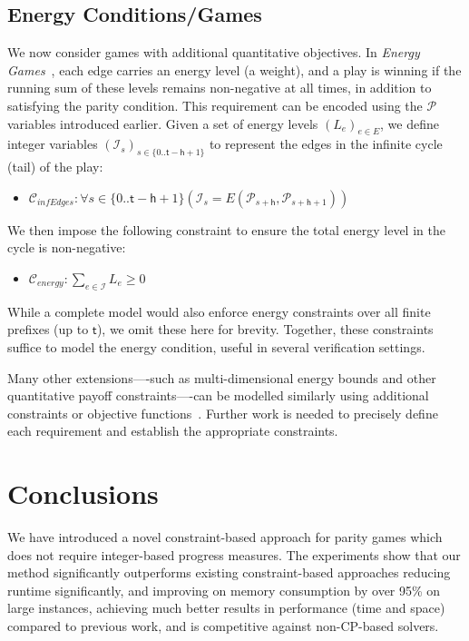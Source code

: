 \documentclass[runningheads]{llncs}
\begin{document}
\subsection{Energy Conditions/Games}

We now consider games with additional quantitative objectives. In \textit{Energy Games}~\cite{Chatterjee:2010}, each edge carries an energy level (a weight), and a play is winning if the running sum of these levels remains non-negative at all times, in addition to satisfying the parity condition.
%
This requirement can be encoded using the $\mathcal{P}$ variables introduced earlier. Given a set of energy levels $(L_e)_{e \in E}$, we define integer variables $(\mathcal{I}_s)_{s \in \{0..\mathsf{t} - \mathsf{h} + 1\}}$ to represent the edges in the infinite cycle (tail) of the play:

\begin{itemize}
    \item $\mathcal{C}_{\textit{infEdges}} : \forall s \in \{0..\mathsf{t} - \mathsf{h} + 1\} (\mathcal{I}_s = E(\mathcal{P}_{s+\mathsf{h}}, \mathcal{P}_{s+\mathsf{h}+1}))$
\end{itemize}

We then impose the following constraint to ensure the total energy level in the cycle is non-negative:

\begin{itemize}
    \item $\mathcal{C}_{\textit{energy}} : \sum_{e \in \mathcal{I}} L_e \geq 0$
\end{itemize}

While a complete model would also enforce energy constraints over all finite prefixes (up to $\mathsf{t}$), we omit these here for brevity. Together, these constraints suffice to model the energy condition, useful in several verification settings. 

Many other extensions—-such as multi-dimensional energy bounds and other quantitative payoff constraints—-can be modelled similarly using additional constraints or objective functions~\cite{bozzelly:2020,Fijalkow:2014,Mogavero:2015,Weinert:2016}. Further work is needed to precisely define each requirement and establish the appropriate constraints.

\section{Conclusions}
We have introduced a novel constraint-based approach for parity games which does not require integer-based progress measures. The experiments show that our method significantly outperforms existing constraint-based approaches reducing runtime significantly, and improving on memory consumption by over 95\% on large instances, achieving much better results in performance (time and space) compared to previous work, and is competitive against non-CP-based solvers. 
\end{document}
